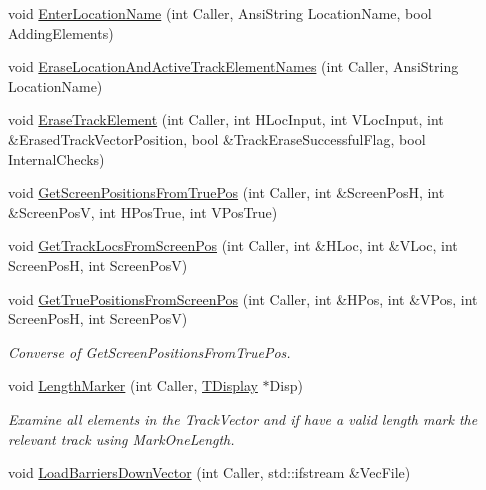 \begin{DoxyCompactItemize}
\item 
void \mbox{\hyperlink{class_t_track_a433736aed04f76b3d0c39f0696c3bb18}{Enter\+Location\+Name}} (int Caller, Ansi\+String Location\+Name, bool Adding\+Elements)
\item 
void \mbox{\hyperlink{class_t_track_a13a1cc9770c8729d04ad4c0130f91634}{Erase\+Location\+And\+Active\+Track\+Element\+Names}} (int Caller, Ansi\+String Location\+Name)
\item 
void \mbox{\hyperlink{class_t_track_aa7b58c83ca1743ad3e4607ac0af9c71c}{Erase\+Track\+Element}} (int Caller, int H\+Loc\+Input, int V\+Loc\+Input, int \&Erased\+Track\+Vector\+Position, bool \&Track\+Erase\+Successful\+Flag, bool Internal\+Checks)
\item 
void \mbox{\hyperlink{class_t_track_abda5d1209d5a197f1cefb851f567736d}{Get\+Screen\+Positions\+From\+True\+Pos}} (int Caller, int \&Screen\+PosH, int \&Screen\+PosV, int H\+Pos\+True, int V\+Pos\+True)
\item 
void \mbox{\hyperlink{class_t_track_ac57ebd0462a3e0d8323e7b5cbc0e20ca}{Get\+Track\+Locs\+From\+Screen\+Pos}} (int Caller, int \&H\+Loc, int \&V\+Loc, int Screen\+PosH, int Screen\+PosV)
\item 
\mbox{\label{class_t_track_a21ad3e4a9e659cf12122691951e19fb6}} 
void \mbox{\hyperlink{class_t_track_a21ad3e4a9e659cf12122691951e19fb6}{Get\+True\+Positions\+From\+Screen\+Pos}} (int Caller, int \&H\+Pos, int \&V\+Pos, int Screen\+PosH, int Screen\+PosV)
\begin{DoxyCompactList}\small\item\em Converse of Get\+Screen\+Positions\+From\+True\+Pos. \end{DoxyCompactList}\item 
\mbox{\label{class_t_track_a8520abf65484aa83a28329a633836f97}} 
void \mbox{\hyperlink{class_t_track_a8520abf65484aa83a28329a633836f97}{Length\+Marker}} (int Caller, \mbox{\hyperlink{class_t_display}{T\+Display}} $\ast$Disp)
\begin{DoxyCompactList}\small\item\em Examine all elements in the Track\+Vector and if have a valid length mark the relevant track using Mark\+One\+Length. \end{DoxyCompactList}\item 
\mbox{\label{class_t_track_a96563ccfea0293d240212db434f4e3e0}} 
void \mbox{\hyperlink{class_t_track_a96563ccfea0293d240212db434f4e3e0}{Load\+Barriers\+Down\+Vector}} (int Caller, std\+::ifstream \&Vec\+File)

\end{DoxyCompactItemize}
